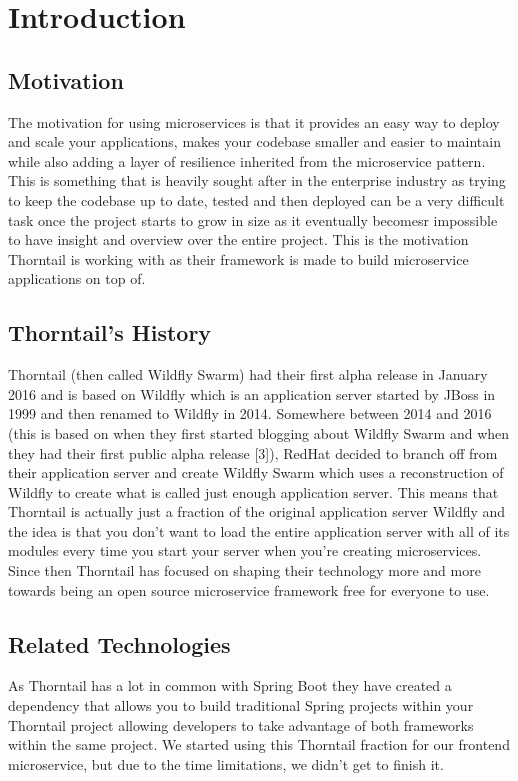 \section{Introduction}
\label{sec:introduction}

\subsection{Motivation}
The motivation for using microservices is that it provides an easy way to deploy and scale your applications, makes your codebase smaller and easier to maintain while also adding a layer of resilience inherited from the microservice pattern. This is something that is heavily sought after in the enterprise industry as trying to keep the codebase up to date, tested and then deployed can be a very difficult task once the project starts to grow in size as it eventually becomesr impossible to have insight and overview over the entire project. This is the motivation Thorntail is working with as their framework is made to build microservice applications on top of.

\subsection{Thorntail's History}
Thorntail (then called Wildfly Swarm) had their first alpha release in January 2016 and is based on Wildfly which is an application server started by JBoss in 1999 and then renamed to Wildfly in 2014. Somewhere between 2014 and 2016 (this is based on when they first started blogging about Wildfly Swarm and when they had their first public alpha release [3]), RedHat decided to branch off from their application server and create Wildfly Swarm which uses a reconstruction of Wildfly to create what is called just enough application server. This means that Thorntail is actually just a fraction of the original application server Wildfly and the idea is that you don’t want to load the entire application server with all of its modules every time you start your server when you’re creating microservices. Since then Thorntail has focused on shaping their technology more and more towards being an open source microservice framework free for everyone to use. \cite{ThorntailAnnouncement}

\subsection{Related Technologies}
As Thorntail has a lot in common with Spring Boot they have created a dependency that allows you to build traditional Spring projects within your Thorntail project allowing developers to take advantage of both frameworks within the same project. We started using this Thorntail fraction for our frontend microservice, but due to the time limitations, we didn’t get to finish it.

